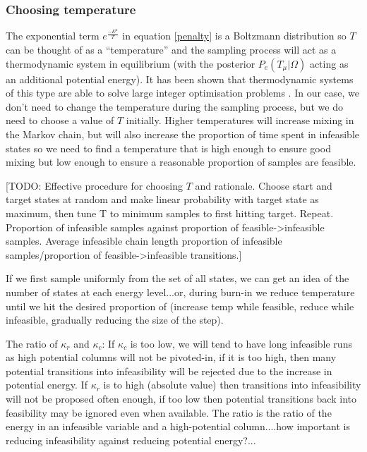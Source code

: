 \documentclass{article}
\begin{document}
\subsubsection{Choosing temperature}
The exponential term $e^{\frac{-E^\mu}{T}}$ in equation \eqref{penalty} is a Boltzmann distribution so $T$ can be thought of as a ``temperature'' and the sampling process will act as a thermodynamic system in equilibrium (with the posterior $P_e(T_\mu|\Omega)$ acting as an additional potential energy).  It has been shown that thermodynamic systems of this type are able to solve large integer optimisation problems \cite{kirkpatrick1983optimization}. In our case, we don't need to change the temperature during the sampling process, but we do need to choose a value of $T$ initially. Higher temperatures will increase mixing in the Markov chain, but will also increase the proportion of time spent in infeasible states so we need to find a temperature that is high enough to ensure good mixing but low enough to ensure a reasonable proportion of samples are feasible.

[TODO: Effective procedure for choosing $T$ and rationale. Choose start and target states at random and make linear probability with target state as maximum, then tune T to minimum samples to first hitting target. Repeat.
 Proportion of infeasible samples against proportion of feasible->infeasible samples. Average infeasible chain length proportion of infeasible samples/proportion of feasible->infeasible transitions.]
 
 If we first sample uniformly from the set of all states, we can get an idea of the number of states at each energy level...or, during burn-in we reduce temperature until we hit the desired proportion of (increase temp while feasible, reduce while infeasible, gradually reducing the size of the step).
 
 The ratio of $\kappa_r$ and $\kappa_c$: If $\kappa_c$ is too low, we will tend to have long infeasible runs as high potential columns will not be pivoted-in, if it is too high, then many potential transitions into infeasibility will be rejected due to the increase in potential energy. If $\kappa_r$ is to high (absolute value) then transitions into infeasibility will not be proposed often enough, if too low then potential transitions back into feasibility may be ignored even when available. The ratio is the ratio of the energy in an infeasible variable and a high-potential column....how important is reducing infeasibility against reducing potential energy?...
\end{document}
